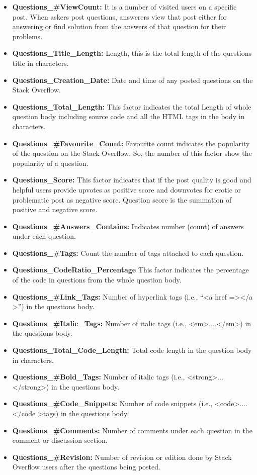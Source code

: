\documentclass[conference]{IEEEtran}
\begin{document}
	\begin{itemize}
		\item \textbf{Questions\_\#ViewCount:} It is a number of visited users on a specific post.  When askers post questions, answerers view that post either for answering or find solution from the answers of that question for their problems. 
		\item \textbf{Questions\_Title\_Length:} Length, this is the total length of the questions title in characters.
		\item \textbf{Questions\_Creation\_Date:}  Date and time of any posted questions on the Stack Overflow.
		\item \textbf{Questions\_Total\_Length:} This factor indicates the total Length of whole question body including source code and all the HTML tags in the body in characters.   
		\item \textbf{Questions\_\#Favourite\_Count: } Favourite count indicates the popularity of the question on the Stack Overflow. So, the number of this factor show the popularity of a question.
		\item \textbf{Questions\_Score: } This factor indicates that if the post quality is good and helpful users provide upvotes as positive score and downvotes for erotic or problematic post as negative score. Question score is the summation of positive and negative score.
		\item \textbf{Questions\_\#Answers\_Contains: } Indicates number (count) of answers under each question.   
		\item \textbf{Questions\_\#Tags: } Count the number of tags attached to each question.
		\item \textbf{Questions\_CodeRatio\_Percentage} This factor indicates the percentage of the code in questions from the whole question body.  
		\item \textbf{Questions\_\#Link\_Tags: } Number of hyperlink tags (i.e., “\textless a href =\textgreater\textless /a \textgreater”) in the questions body.
		\item \textbf{Questions\_\#Italic\_Tags: }Number of italic tags (i.e., \textless em\textgreater....\textless /em\textgreater) in the questions body.
		\item \textbf{Questions\_Total\_Code\_Length: }Total code length in the question body in characters.
		\item \textbf{Questions\_\#Bold\_Tags: }Number of italic tags (i.e., \textless strong\textgreater...\textless/strong\textgreater) in the questions body.
		\item \textbf{Questions\_\#Code\_Snippets:} Number of code snippets (i.e., \textless code\textgreater....\textless/code \textgreater tags) in the questions body.
		\item \textbf{Questions\_\#Comments: } Number of comments under each question in the comment or discussion section. 
		\item \textbf{Questions\_\#Revision: } Number of revision or edition done by Stack Overflow users after the questions being posted.
	\end{itemize}
	
\end{document}
